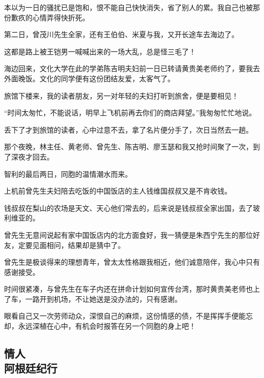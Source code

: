 \par 本以为一日的骚扰已是饱和，恨不能自己快快消失，省了别人的累。我自己也被那份歉疚的心情弄得快折死。
\par 第二日，曾茂川先生全家，还有王伯伯、米夏与我，又开长途车去海边了。
\par 这都是路上被王铠男一喊喊出来的一场大乱，总是怪三毛了！
\par 海边回来，文化大学在此的学弟陈吉明夫妇前一日已转请黄贵美老师约了，要我去外面晚饭。文化的同学便有这份团结友爱，太客气了。
\par 旅馆下楼来，我的读者朋友，另一对年轻的夫妇打听到旅舍，便是要相见！
\par “时间太匆忙，不能说话，明早上飞机前再去你们的商店拜望。”我匆匆忙忙地说。
\par 丢下了才到旅馆的读者，心中过意不去，拿了名片便分手了，次日当然去一趟。
\par 那个夜晚，林主任、黄老师、曾先生、陈吉明、廖玉瑟和我又抢时间聚了一次，到了深夜才回去。
\par 智利的最后两日，同胞的温情潮水而来。
\par 上机前曾先生夫妇陪去吃饭的中国饭店的主人钱维国叔叔又是不肯收钱。
\par 钱叔叔在梨山的农场是天文、天心他们常去的，后来说是钱叔叔全家出国，去了玻利维亚的。
\par 曾先生无意间说起有家中国饭店内的北方面食好，我一猜便是朱西宁先生的那位好友，定要见面相问，结果却是猜中了。
\par 曾先生是极谈得来的理想青年，曾太太性格跟我相近，他们诚意陪伴，我心中只有感谢接受。
\par 时间很紧凑，与曾先生在车子内还在拼命计划如何宣传台湾，那时黄贵美老师也上了车，一路开到机场，不让她送是没办法的，只有感谢。
\par 眼看自己又一次劳师动众，深恨自己的麻烦，这份情感的债，不是挥挥手便能忘却，永远深植在心中，有机会时报答在另一个同胞的身上吧！



\subsection{情人\\\small{阿根廷纪行}}



